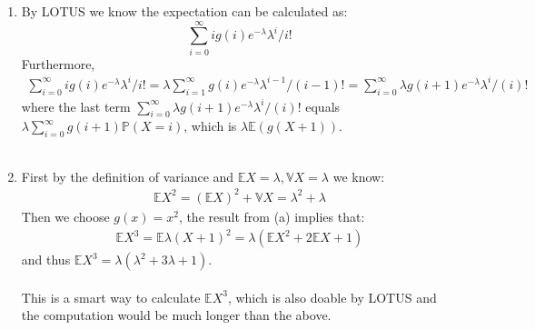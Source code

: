 
\setcounter{theorem}{29}
\begin{exercise} [BH.4.30]
\begin{solution}
    \begin{enumerate}
        \item By LOTUS we know the expectation can be calculated as: 
        $$	\sum_{i=0}^\infty ig(i) e^{-\lambda} \lambda^i/i! $$
        Furthermore,
        \begin{align*}
            \sum_{i=0}^\infty ig(i) e^{-\lambda} \lambda^i/i! = 	\lambda \sum_{i=1}^\infty g(i) e^{-\lambda} \lambda^{i-1}/(i-1)!= 	 \sum_{i=0}^\infty \lambda g(i+1) e^{-\lambda} \lambda^{i}/(i)!  
        \end{align*}
        where the last term $ \sum_{i=0}^\infty \lambda g(i+1) e^{-\lambda} \lambda^{i}/(i)!  $ equals $\lambda \sum_{i=0}^\infty  g(i+1) \mathbb{P}(X=i)$, which is $\lambda\mathbb{E}\left(g(X+1)\right)$.\\~\\
        \item First by the definition of variance  and $\mathbb{E}X=\lambda, \mathbb{V}X=\lambda$ we know:
        \begin{align*}
            \mathbb{E}X^2 = (\mathbb{E}X)^2 +\mathbb{V}X =\lambda^2 +\lambda
        \end{align*}
        Then we choose $g(x)=x^2$, the result from (a) implies that: 
        \begin{align*}
            \mathbb{E}X^3= \mathbb{E}\lambda (X+1)^2 = \lambda\left(\mathbb{E}X^2 +2\mathbb{E}X +1  \right)    
        \end{align*}
        and thus $\mathbb{E}X^3 = \lambda (\lambda^2+3\lambda +1).$\\~~\\
        This is a smart way to calculate $\mathbb{E}X^3$, which is also doable by LOTUS and the computation would be much longer than the above.
    \end{enumerate}
\end{solution}
\end{exercise}

